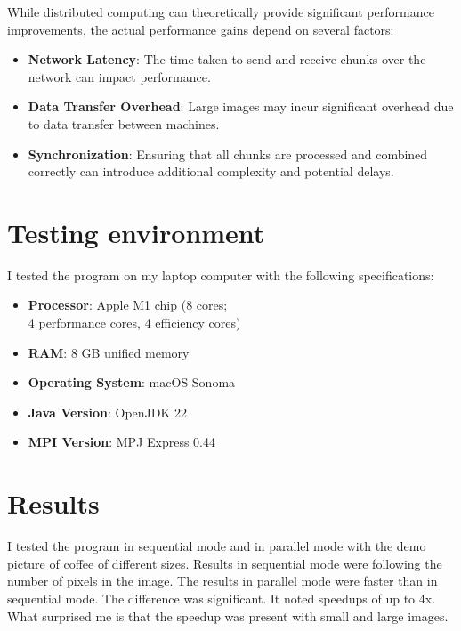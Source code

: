 \documentclass{article}
\begin{document}
\begin{multicols}{2}
    While distributed computing can theoretically provide significant performance improvements, the actual performance gains depend on several factors:
    \begin{itemize}
        \item \textbf{Network Latency}: The time taken to send and receive chunks over the network can impact performance.
        \item \textbf{Data Transfer Overhead}: Large images may incur significant overhead due to data transfer between machines.
        \item \textbf{Synchronization}: Ensuring that all chunks are processed and combined correctly can introduce additional complexity and potential delays.
    \end{itemize}

    \section{Testing environment}

    I tested the program on my laptop computer with the following specifications:

    \begin{itemize}
        \item \textbf{Processor}: Apple M1 chip (8 cores;\\4 performance cores, 4 efficiency cores)
        \item \textbf{RAM}: 8 GB unified memory
        \item \textbf{Operating System}: macOS Sonoma
        \item \textbf{Java Version}: OpenJDK 22
        \item \textbf{MPI Version}: MPJ Express 0.44
    \end{itemize}

    \section{Results}

    I tested the program in sequential mode and in parallel mode with the demo picture of coffee of different sizes. Results in sequential mode were following the number of pixels in the image. The results in parallel mode were faster than in sequential mode. The difference was significant. It noted speedups of up to 4x. What surprised me is that the speedup was present with small and large images.


\end{multicols}
\end{document}
